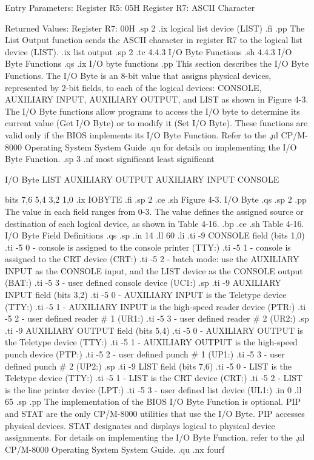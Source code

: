                Entry Parameters:
                  Register   R5:  05H
                  Register   R7:  ASCII Character

               Returned  Values:
                  Register   R7:  00H
.sp 2
.ix logical list device (LIST)
.fi
.pp
The List Output function sends the ASCII character in register
  R7 to the logical list device (LIST).
.ix list output
.sp 2
.tc         4.4.3  I/O Byte Functions
.sh
4.4.3  I/O Byte Functions
.qs
.ix I/O byte functions
.pp
This section describes the I/O Byte Functions.  The I/O Byte is
an 8-bit value that assigns physical devices, represented by 2-bit 
fields, to each of the logical
devices: CONSOLE, AUXILIARY INPUT, AUXILIARY OUTPUT, and LIST as
shown in Figure 4-3. The I/O Byte functions allow programs to
access the I/O byte to determine its current value (Get I/O Byte)
or to modify it (Set I/O Byte).  These functions are valid only
if the BIOS implements its I/O Byte Function.  Refer to the \c
.ul
CP/M-8000 Operating System System Guide 
.qu
for details on implementing the I/O Byte Function. 
.sp 3
.nf
                 most significant        least significant

I/O Byte     LIST  AUXILIARY OUTPUT   AUXILIARY INPUT CONSOLE

bits          7,6           5,4           3,2           1,0         
.ix IOBYTE
.fi
.sp 2
.ce
.sh
Figure 4-3.  I/O Byte
.qs
.sp 2 
.pp
The value in each field ranges from 0-3. The value defines the
assigned source or destination of each logical device, as shown in Table 
4-16.
.bp
.ce
.sh
Table 4-16.  I/O Byte Field Definitions
.qs
.sp
.in 14
.ll 60
.li
.ti -9
CONSOLE field (bits 1,0)
.ti -5
0  - console is assigned to the console printer (TTY:)
.ti -5
1  - console is assigned to the CRT device (CRT:)
.ti -5
2  - batch mode: use the AUXILIARY INPUT as the CONSOLE input, and the 
LIST device as the CONSOLE output (BAT:)
.ti -5
3  - user defined console device (UC1:)
.sp
.ti -9
AUXILIARY INPUT field (bits 3,2)
.ti -5
0  - AUXILIARY INPUT is the Teletype device (TTY:)
.ti -5
1  - AUXILIARY INPUT is the high-speed reader device (PTR:)
.ti -5
2  - user defined reader # 1 (UR1:)
.ti -5
3  - user defined reader # 2 (UR2:)
.sp
.ti -9
AUXILIARY OUTPUT field (bits 5,4)
.ti -5
0  - AUXILIARY OUTPUT is the Teletype device (TTY:)
.ti -5
1  - AUXILIARY OUTPUT is the high-speed punch device (PTP:)
.ti -5
2  - user defined punch # 1 (UP1:)
.ti -5
3  - user defined punch # 2 (UP2:)
.sp
.ti -9
LIST field (bits 7,6)
.ti -5
0  - LIST is the Teletype device (TTY:)
.ti -5
1  - LIST is the CRT device (CRT:)
.ti -5
2  - LIST is the line printer device (LPT:)
.ti -5
3  - user defined list device (UL1:)
.in 0
.ll 65
.sp
.pp
The implementation of the BIOS I/O Byte Function is optional. PIP
and STAT are the only CP/M-8000 utilities that use the I/O Byte.
PIP accesses physical devices. STAT designates and displays
logical to physical device assignments. For details on implementing
the I/O Byte Function, refer to the \c
.ul
CP/M-8000 Operating System System Guide. 
.qu
.nx fourf
